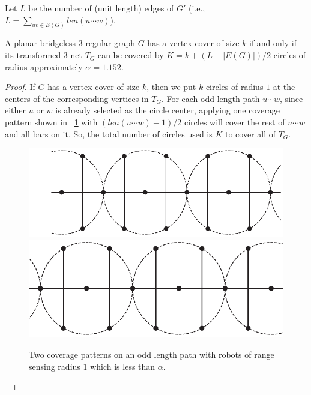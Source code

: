 Let $L$ be the number of (unit length) edges of $G'$ (i.e., $L = 
\sum_{uv \in E(G)}len(u\cdots w)$). 
\begin{lemma}\label{l:osg-bl}
A planar bridgeless $3$-regular graph $G$ has a vertex cover of size 
$k$ if and only if its transformed 3-net $T_G$ can be covered
by $K = k + (L-|E(G)|)/2$ circles of radius approximately $\alpha = 1.152$.
\end{lemma}
\begin{proof}
If $G$ has a vertex cover of size $k$, then we put $k$ circles of radius $1$
at the centers of the corresponding vertices in $T_G$. 
%
For each odd length path $u\cdots w$, since either $u$ or $w$ is already 
selected as the circle center, applying one coverage pattern shown
in ~\ref{fig:osg-pathcover} with $(len(u\cdots w) - 1)/2$ circles will cover 
the rest of $u\cdots w$ and all bars on it. So, the total number of circles
used is $K$ to cover all of $T_G$. 

\begin{figure}[!ht]
  \vspace*{0mm}
      \centering
      \includegraphics[scale=0.3]{chapters/osg/figures/edgepath1-eps-converted-to.pdf}\vspace{3mm}
      \includegraphics[scale=0.3]{chapters/osg/figures/edgepath2-eps-converted-to.pdf}
  \vspace*{0mm}
     \caption{Two coverage patterns on an odd length path with robots of 
      range sensing radius $1$ which is less than $\alpha$.}
      \label{fig:osg-pathcover}
  \end{figure}
  

\end{proof}
